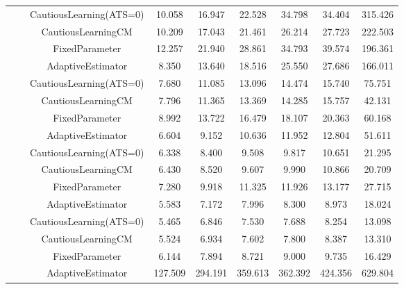 \begin{table}[!h]
\begin{tabular}[t]{ccccccccc}
 &  & CautiousLearning(ATS=0) & 10.058 & 16.947 & 22.528 & 34.798 & 34.404 & 315.426\\

 &  & CautiousLearningCM & 10.209 & 17.043 & 21.461 & 26.214 & 27.723 & 222.503\\

 & \multirow[t]{-4}{*}{\centering\arraybackslash 0.75} & FixedParameter & 12.257 & 21.940 & 28.861 & 34.793 & 39.574 & 196.361\\
\cmidrule{2-9}
 &  & AdaptiveEstimator & 8.350 & 13.640 & 18.516 & 25.550 & 27.686 & 166.011\\

 &  & CautiousLearning(ATS=0) & 7.680 & 11.085 & 13.096 & 14.474 & 15.740 & 75.751\\

 &  & CautiousLearningCM & 7.796 & 11.365 & 13.369 & 14.285 & 15.757 & 42.131\\

 & \multirow[t]{-4}{*}{\centering\arraybackslash 1.00} & FixedParameter & 8.992 & 13.722 & 16.479 & 18.107 & 20.363 & 60.168\\
\cmidrule{2-9}
 &  & AdaptiveEstimator & 6.604 & 9.152 & 10.636 & 11.952 & 12.804 & 51.611\\

 &  & CautiousLearning(ATS=0) & 6.338 & 8.400 & 9.508 & 9.817 & 10.651 & 21.295\\

 &  & CautiousLearningCM & 6.430 & 8.520 & 9.607 & 9.990 & 10.866 & 20.709\\

 & \multirow[t]{-4}{*}{\centering\arraybackslash 1.25} & FixedParameter & 7.280 & 9.918 & 11.325 & 11.926 & 13.177 & 27.715\\
\cmidrule{2-9}
 &  & AdaptiveEstimator & 5.583 & 7.172 & 7.996 & 8.300 & 8.973 & 18.024\\

 &  & CautiousLearning(ATS=0) & 5.465 & 6.846 & 7.530 & 7.688 & 8.254 & 13.098\\

 &  & CautiousLearningCM & 5.524 & 6.934 & 7.602 & 7.800 & 8.387 & 13.310\\

\multirow[t]{-28}{*}{\centering\arraybackslash 1} & \multirow[t]{-4}{*}{\centering\arraybackslash 1.50} & FixedParameter & 6.144 & 7.894 & 8.721 & 9.000 & 9.735 & 16.429\\
\cmidrule{1-9}
 &  & AdaptiveEstimator & 127.509 & 294.191 & 359.613 & 362.392 & 424.356 & 629.804\\


\end{tabular}
\end{table}

